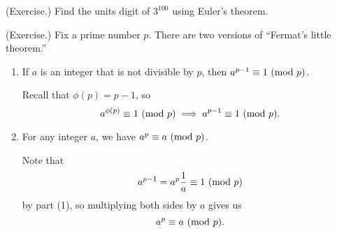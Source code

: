 \documentclass[letterpaper]{article}
\begin{document}
\begin{mdframed}
    (Exercise.) Find the units digit of $3^{100}$ using Euler's theorem.

    \begin{mdframed}
        
    \end{mdframed}
\end{mdframed}

\begin{mdframed}
    (Exercise.) Fix a prime number $p$. There are two versions of ``Fermat's little theorem.''
    \begin{enumerate}
        \item If $a$ is an integer that is not divisible by $p$, then $a^{p - 1} \equiv 1 \ (\mathrm{mod}\ p)$. 
        
        \begin{mdframed}
            Recall that $\phi(p) = p - 1$, so 
            \[a^{\phi(p)} \equiv 1 \ (\mathrm{mod}\ p) \implies a^{p - 1} \equiv 1 \ (\mathrm{mod}\ p).\]
        \end{mdframed}

        \item For any integer $a$, we have $a^p \equiv a \ (\mathrm{mod}\ p)$. 
        
        \begin{mdframed}
            Note that 
            \[a^{p - 1} = a^p \frac{1}{a} \equiv 1 \ (\mathrm{mod}\ p)\]
            by part (1), so multiplying both sides by $a$ gives us 
            \[a^p \equiv a \ (\mathrm{mod}\ p).\]
        \end{mdframed}
    \end{enumerate}
\end{mdframed}
\end{document}
